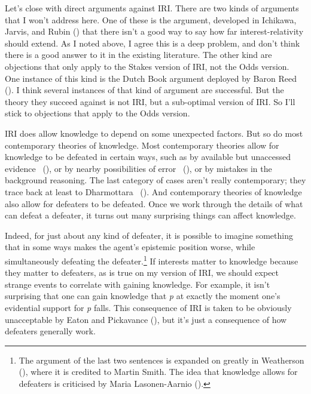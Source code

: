 \documentclass[
  10pt,
  letterpaper,
  DIV=11,
  numbers=noendperiod,
  twoside]{scrartcl}
\begin{document}
Let's close with direct arguments against IRI. There are two kinds of
arguments that I won't address here. One of these is the argument,
developed in Ichikawa, Jarvis, and Rubin
() that there isn't a good way to
say how far interest-relativity should extend. As I noted above, I agree
this is a deep problem, and don't think there is a good answer to it in
the existing literature. The other kind are objections that only apply
to the Stakes version of IRI, not the Odds version. One instance of this
kind is the Dutch Book argument deployed by Baron Reed
(). I think several instances of that kind
of argument are successful. But the theory they succeed against is not
IRI, but a sub-optimal version of IRI. So I'll stick to objections that
apply to the Odds version.

IRI does allow knowledge to depend on some unexpected factors. But so do
most contemporary theories of knowledge. Most contemporary theories
allow for knowledge to be defeated in certain ways, such as by available
but unaccessed evidence ~(),
or by nearby possibilities of error ~(), or by mistakes in the background reasoning. The last category of
cases aren't really contemporary; they trace back at least to
Dharmottara ~(). And
contemporary theories of knowledge also allow for defeaters to be
defeated. Once we work through the details of what can defeat a
defeater, it turns out many surprising things can affect knowledge.

Indeed, for just about any kind of defeater, it is possible to imagine
something that in some ways makes the agent's epistemic position worse,
while simultaneously defeating the defeater.\footnote{The argument of
  the last two sentences is expanded on greatly in Weatherson
  (), where it is
  credited to Martin Smith. The idea that knowledge allows for defeaters
  is criticised by Maria Lasonen-Aarnio
  ().} If interests matter to
knowledge because they matter to defeaters, as is true on my version of
IRI, we should expect strange events to correlate with gaining
knowledge. For example, it isn't surprising that one can gain knowledge
that \emph{p} at exactly the moment one's evidential support for
\emph{p} falls. This consequence of IRI is taken to be obviously
unacceptable by Eaton and Pickavance
(), but it's just a consequence
of how defeaters generally work.
\end{document}
